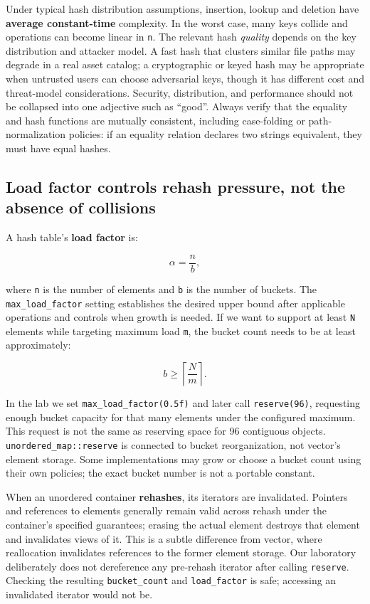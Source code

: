 Under typical hash distribution assumptions, insertion, lookup and deletion have \textbf{average constant-time} complexity. In the worst case, many keys collide and operations can become linear in \texttt{n}. The relevant hash \emph{quality} depends on the key distribution and attacker model. A fast hash that clusters similar file paths may degrade in a real asset catalog; a cryptographic or keyed hash may be appropriate when untrusted users can choose adversarial keys, though it has different cost and threat-model considerations. Security, distribution, and performance should not be collapsed into one adjective such as ``good''. Always verify that the equality and hash functions are mutually consistent, including case-folding or path-normalization policies: if an equality relation declares two strings equivalent, they must have equal hashes.

\subsection{Load factor controls rehash pressure, not the absence of collisions}\label{05-engine-i-ch005-load-factor-controls-rehash-pressure-not-the-absence-of-collisions}

A hash table's \textbf{load factor} is:

\[
\alpha = \frac{n}{b},
\]

where \texttt{n} is the number of elements and \texttt{b} is the number of buckets. The \texttt{max\_load\_factor} setting establishes the desired upper bound after applicable operations and controls when growth is needed. If we want to support at least \texttt{N} elements while targeting maximum load \texttt{m}, the bucket count needs to be at least approximately:

\[
b \ge \left\lceil \frac{N}{m} \right\rceil.
\]

In the lab we set \texttt{max\_load\_factor(0.5f)} and later call \texttt{reserve(96)}, requesting enough bucket capacity for that many elements under the configured maximum. This request is not the same as reserving space for 96 contiguous objects. \texttt{unordered\_map::reserve} is connected to bucket reorganization, not vector's element storage. Some implementations may grow or choose a bucket count using their own policies; the exact bucket number is not a portable constant.

When an unordered container \textbf{rehashes}, its iterators are invalidated. Pointers and references to elements generally remain valid across rehash under the container's specified guarantees; erasing the actual element destroys that element and invalidates views of it. This is a subtle difference from vector, where reallocation invalidates references to the former element storage. Our laboratory deliberately does not dereference any pre-rehash iterator after calling \texttt{reserve}. Checking the resulting \texttt{bucket\_count} and \texttt{load\_factor} is safe; accessing an invalidated iterator would not be.

